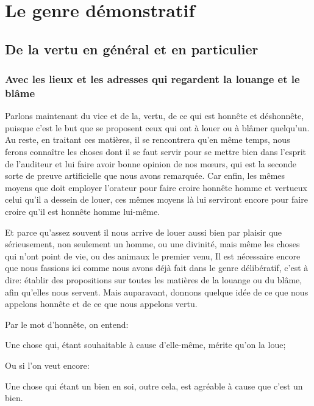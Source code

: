 
\chapter{Le genre démonstratif}
\section{De la vertu en général et en particulier}
\subsection{Avec les lieux et les adresses qui regardent la louange et le blâme}

Parlons maintenant du vice et de la, vertu, de ce qui est honnête et déshonnête, puisque c'est le but que se
proposent ceux qui ont à louer ou à blâmer quelqu'un. Au reste, en traitant ces matières, il se rencontrera
qu'en même temps, nous ferons connaître les choses dont il se faut servir pour se mettre bien dans l'esprit
de l'auditeur et lui faire avoir bonne opinion de nos mœurs, qui est la seconde sorte de preuve artificielle
que nous avons remarquée. Car enfin, les mêmes moyens que doit employer l'orateur pour faire croire honnête
homme et vertueux celui qu'il a dessein de louer, ces mêmes moyens là lui serviront encore pour faire croire
qu'il est honnête homme lui-même.

Et parce qu'assez souvent il nous arrive de louer aussi bien par plaisir que sérieusement, non seulement un
homme, ou une divinité, mais même les choses qui n'ont point de vie, ou des animaux le premier venu, Il est
nécessaire encore que nous fassions ici comme nous avons déjà fait dans le genre délibératif, c'est à dire:
établir des propositions sur toutes les matières de la louange ou du blâme, afin qu'elles nous servent. Mais
auparavant, donnons quelque idée de ce que nous appelons honnête et de ce que nous appelons vertu.

\bigbreak

Par le mot d'honnête, on entend:

\begin{emphpar}
	Une chose qui, étant souhaitable à cause d'elle-même, mérite qu'on la loue;
\end{emphpar}

Ou si l'on veut encore:

\begin{emphpar}
	Une chose qui étant un bien en soi, outre cela, est agréable à cause que c'est un bien.
\end{emphpar}

